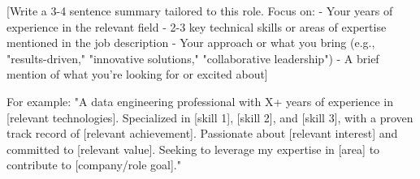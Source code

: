 
\begin{cvparagraph}

[Write a 3-4 sentence summary tailored to this role. Focus on:
- Your years of experience in the relevant field
- 2-3 key technical skills or areas of expertise mentioned in the job description
- Your approach or what you bring (e.g., "results-driven," "innovative solutions," "collaborative leadership")
- A brief mention of what you're looking for or excited about]

For example:
"A data engineering professional with X+ years of experience in [relevant technologies]. Specialized in [skill 1], [skill 2], and [skill 3], with a proven track record of [relevant achievement]. Passionate about [relevant interest] and committed to [relevant value]. Seeking to leverage my expertise in [area] to contribute to [company/role goal]."

\end{cvparagraph}
